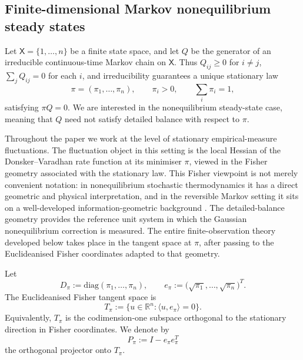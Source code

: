 \documentclass[11pt,a4paper]{article}
\numberwithin{equation}{section}
\theoremstyle{thmcompact}
\theoremstyle{remark}
\begin{document}
\subsection{Finite-dimensional Markov nonequilibrium steady states}

Let \(\mathsf X=\{1,\dots,n\}\) be a finite state space, and let \(Q\) be the generator of an irreducible continuous-time Markov chain on \(\mathsf X\). Thus \(Q_{ij}\ge 0\) for \(i\neq j\), \(\sum_j Q_{ij}=0\) for each \(i\), and irreducibility guarantees a unique stationary law
\begin{equation}
\pi=(\pi_1,\dots,\pi_n),\qquad \pi_i>0,\qquad \sum_i \pi_i=1,
\end{equation}
satisfying \(\pi Q=0\). We are interested in the nonequilibrium steady-state case, meaning that \(Q\) need not satisfy detailed balance with respect to \(\pi\).

Throughout the paper we work at the level of stationary empirical-measure fluctuations. The fluctuation object in this setting is the local Hessian of the Donsker--Varadhan rate function at its minimiser \(\pi\), viewed in the Fisher geometry associated with the stationary law. This Fisher viewpoint is not merely convenient notation: in nonequilibrium stochastic thermodynamics it has a direct geometric and physical interpretation, and in the reversible Markov setting it sits on a well-developed information-geometric background \cite{Ito2018,WolferWatanabe2021}. The detailed-balance geometry provides the reference unit system in which the Gaussian nonequilibrium correction is measured. The entire finite-observation theory developed below takes place in the tangent space at \(\pi\), after passing to the Euclideanised Fisher coordinates adapted to that geometry.

Let
\begin{equation}
D_\pi:=\mathrm{diag}(\pi_1,\dots,\pi_n),
\qquad
e_\pi:=\bigl(\sqrt{\pi_1},\dots,\sqrt{\pi_n}\bigr)^T.
\end{equation}
The Euclideanised Fisher tangent space is
\begin{equation}
T_\pi
:=
\{u\in\mathbb R^n:\langle u,e_\pi\rangle=0\}.
\end{equation}
Equivalently, \(T_\pi\) is the codimension-one subspace orthogonal to the stationary direction in Fisher coordinates. We denote by
\begin{equation}
P_\pi:=I-e_\pi e_\pi^T
\end{equation}
the orthogonal projector onto \(T_\pi\).
\end{document}
